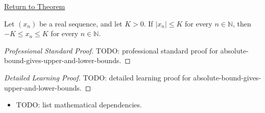 \newpage
{}
\label{prf:absolute-bound-gives-upper-and-lower-bounds}

\begin{remark*}[Return]
\hyperref[thm:absolute-bound-gives-upper-and-lower-bounds]{Return to Theorem}
\end{remark*}

\begin{theorem*}
Let $(x_n)$ be a real sequence, and let $K > 0$. If $|x_n| \le K$ for every
$n \in \mathbb{N}$, then $-K \le x_n \le K$ for every
$n \in \mathbb{N}$.

\smallskip
\noindent
\end{theorem*}

\begin{proof}[Professional Standard Proof]
\LRAProofBodyStart
TODO: professional standard proof for absolute-bound-gives-upper-and-lower-bounds.
\end{proof}

\begin{proof}[Detailed Learning Proof]
\LRAProofBodyStart
TODO: detailed learning proof for absolute-bound-gives-upper-and-lower-bounds.
\end{proof}

\begin{remark*}
\end{remark*}

\begin{dependencies}
\begin{itemize}
  \item TODO: list mathematical dependencies.
\end{itemize}
\end{dependencies}

\clearpage
